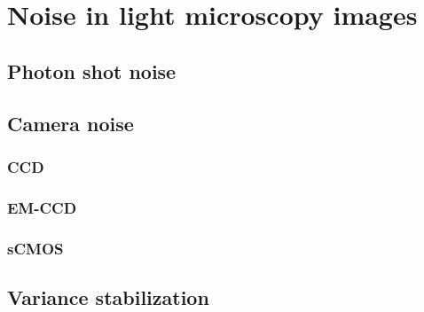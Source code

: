 
\section{Noise in light microscopy images}
  \subsection{Photon shot noise}
  \subsection{Camera noise}
    \subsubsection{CCD}
    \subsubsection{EM-CCD}
    \subsubsection{sCMOS}
  \subsection{Variance stabilization}

